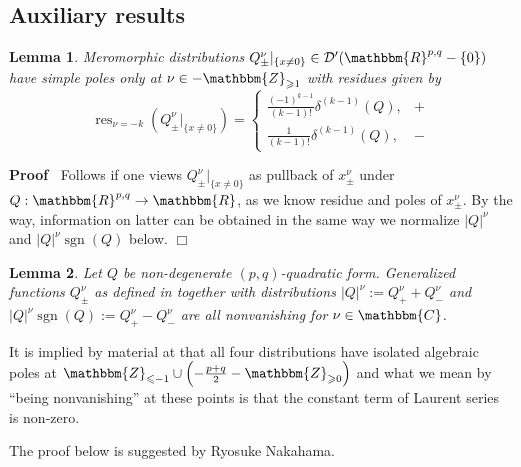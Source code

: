 \documentclass{article}
\newcommand{\assign}{:=}
\newcommand{\tmop}[1]{\ensuremath{\operatorname{#1}}}
\newenvironment{proof}{\noindent\textbf{Proof\ }}{\hspace*{\fill}$\Box$\medskip}
\numberwithin{definition}{section}
\newtheorem{lemma}{Lemma}
\numberwithin{lemma}{section}
\numberwithin{proposition}{section}
{\theorembodyfont{\rmfamily}\newtheorem{remark}{Remark}
\numberwithin{remark}{section}
}
\begin{document}
\subsection{Auxiliary results}

\begin{lemma}
  \label{lem-restricted} Meromorphic distributions $Q_{\pm}^{\nu} |_{\{ x \neq
  0 \}} \in \mathcal{D}' ( \mathbbm{R}^{p, q} - \{ 0 \})$ have simple poles
  only at $\nu \in -\mathbbm{Z}_{\geqslant 1}$ with residues given by
  \[ \tmop{res}_{\nu = - k} ( Q_{\pm}^{\nu} |_{\{ x \neq 0 \}}) = \left\{
     \begin{array}{ll}
       \frac{( - 1)^{k - 1}}{( k - 1) !} \delta^{( k - 1)} ( Q), & +\\
       \frac{1}{( k - 1) !} \delta^{( k - 1)} ( Q), & -
     \end{array} \right. \]
\end{lemma}

\begin{proof}
  Follows if one views $Q^{\nu}_{\pm} |_{\{ x \neq 0 \}}$ as pullback of
  $x_{\pm}^{\nu}$ under $Q : \mathbbm{R}^{p, q} \rightarrow \mathbbm{R}$, as
  we know residue and poles of $x_{\pm}^{\nu}$. By the way, information on
  latter can be obtained in the same way we normalize $| Q |^{\nu}$ and $| Q
  |^{\nu} \tmop{sgn} ( Q)$ below.
\end{proof}

\begin{lemma}
  \label{q-norm:lem-nonzero-strong}Let $Q$ be non-degenerate $( p,
  q)$-quadratic form. Generalized functions $Q_{\pm}^{\nu}$ as defined in
  {\cite[sec III.2.2]{gelfand1980distribution}} together with distributions $|
  Q |^{\nu} \assign Q_+^{\nu} + Q_-^{\nu}$ and $| Q |^{\nu} \tmop{sgn} ( Q)
  \assign Q_+^{\nu} - Q_-^{\nu}$ are all nonvanishing for $\nu \in
  \mathbbm{C}$.
\end{lemma}

\begin{remark}
  It is implied by material at {\cite[sec III.2.2]{gelfand1980distribution}}
  that all four distributions have isolated algebraic poles at
  $\mathbbm{Z}_{\leqslant - 1} \cup \left( - \frac{p + q}{2}
  -\mathbbm{Z}_{\geqslant 0} \right)$ and what we mean by ``being
  nonvanishing'' at these points is that the constant term of Laurent series
  is non-zero.
\end{remark}

\begin{remark}
  The proof below is suggested by Ryosuke Nakahama.
\end{remark}
\end{document}
